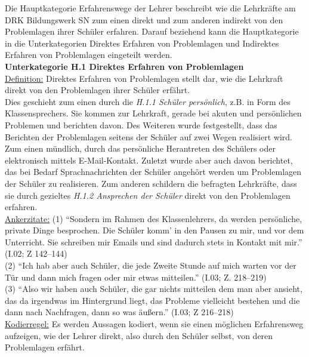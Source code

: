 Die Hauptkategorie Erfahrenswege der Lehrer beschreibt wie die Lehrkräfte am DRK Bildungswerk SN zum einen direkt und zum anderen indirekt von den Problemlagen ihrer Schüler erfahren. Darauf beziehend kann die Hauptkategorie in die Unterkategorien Direktes Erfahren von Problemlagen und Indirektes Erfahren von Problemlagen eingeteilt werden.\\

\textbf{Unterkategorie H.1 Direktes Erfahren von Problemlagen}\\
\underline{Definition:} Direktes Erfahren von Problemlagen stellt dar, wie die Lehrkraft direkt von den Problemlagen ihrer Schüler erfährt. \\
Dies geschieht zum einen durch die \textit{H.1.1 Schüler persönlich}, z.B. in Form des Klassensprechers. Sie kommen zur Lehrkraft, gerade bei akuten und persönlichen Problemen und berichten davon. Des Weiteren wurde festgestellt, dass das Berichten der Problemlagen seitens der Schüler auf zwei Wegen realisiert wird. Zum einen mündlich, durch das persönliche Herantreten des Schülers oder elektronisch mittels E-Mail-Kontakt. Zuletzt wurde aber auch davon berichtet, das bei Bedarf Sprachnachrichten der Schüler angehört werden um Problemlagen der Schüler zu realisieren. Zum anderen schildern die befragten Lehrkräfte, dass sie durch gezieltes \textit{H.1.2 Ansprechen der Schüler} direkt von den Problemlagen erfahren.\\
\underline{Ankerzitate:} (1) "`Sondern im Rahmen des Klassenlehrers, da werden persönliche, private Dinge besprochen. Die Schüler komm' in den Pausen zu mir, und vor dem Unterricht. Sie schreiben mir Emails und sind dadurch stets in Kontakt mit mir."' (I.02; Z 142--144)\\ (2) "`Ich hab aber auch Schüler, die jede Zweite Stunde auf mich warten vor der Tür und dann mich fragen oder mir etwas mitteilen."' (I.03; Z. 218--219)\\ (3) "`Also wir haben auch Schüler, die gar nichts mitteilen dem man aber ansieht, das da irgendwas im Hintergrund liegt, das Probleme vielleicht bestehen und die dann nach Nachfragen, dann so was äußern."' (I.03; Z 216--218)\\
\underline{Kodierregel:} Es werden Aussagen kodiert, wenn sie einen möglichen Erfahrensweg aufzeigen, wie der Lehrer direkt, also durch den Schüler selbst, von deren Problemlagen erfährt.\\

